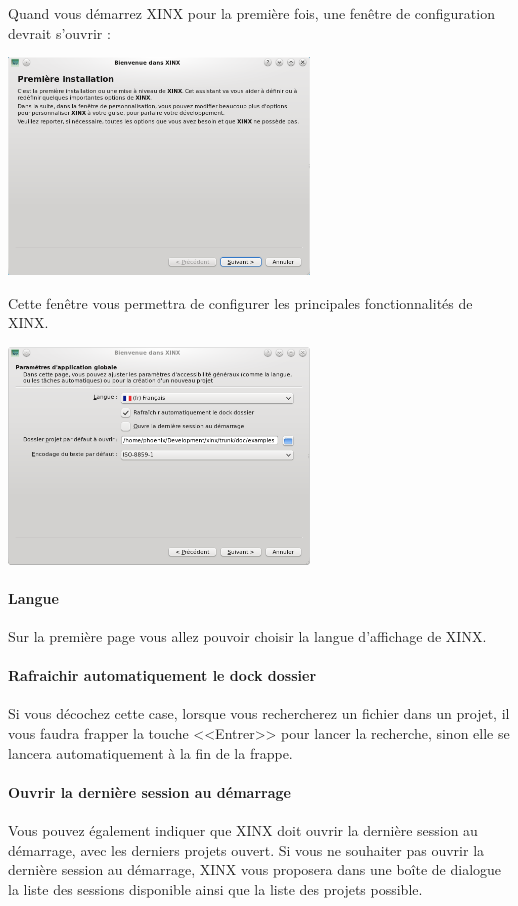 \documentclass[a4paper,10pt,twoside]{book}
\begin{document}
Quand vous démarrez XINX pour la première fois, une fenêtre de configuration devrait s'ouvrir :

\begin{center}
 \includegraphics[width=0.60\textwidth]{./firstinstall1.png}
\end{center}

Cette fenêtre vous permettra de configurer les principales fonctionnalités de XINX. 

\begin{center}
 \includegraphics[width=0.60\textwidth]{./firstinstall2.png}
\end{center}

\paragraph{Langue} Sur la première page vous allez pouvoir choisir la langue d'affichage de XINX. 

\paragraph{Rafraichir automatiquement le dock dossier} Si vous décochez cette case, lorsque vous rechercherez un fichier dans un projet, il vous faudra frapper la touche <<Entrer>> pour lancer la recherche, sinon elle se lancera automatiquement à la fin de la frappe.

\paragraph{Ouvrir la dernière session au démarrage} Vous pouvez également indiquer que XINX doit ouvrir la dernière session au démarrage, avec les derniers projets ouvert. Si vous ne souhaiter pas ouvrir la dernière session au démarrage, XINX vous proposera dans une boîte de dialogue la liste des sessions disponible ainsi que la liste des projets possible.
\end{document}
